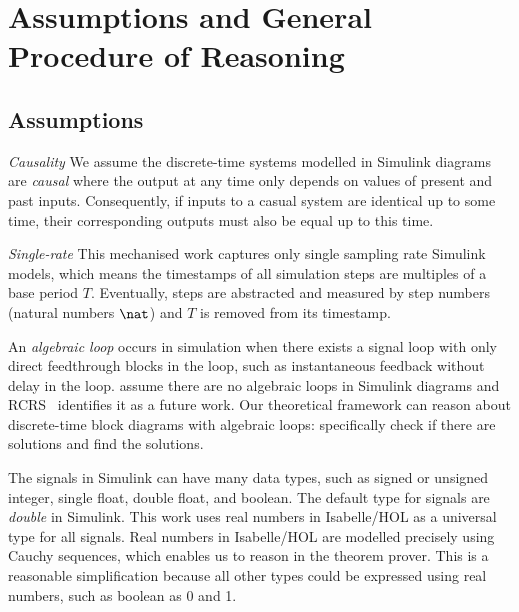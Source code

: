 \section{Assumptions and General Procedure of Reasoning}
\label{sec:assum}
\subsection{Assumptions}
\emph{Causality} We assume the discrete-time systems modelled in Simulink diagrams are \emph{causal} where the output at any time only depends on values of present and past inputs. Consequently, if inputs to a casual system are identical up to some time, their corresponding outputs must also be equal up to this time.

\emph{Single-rate} This mechanised work captures only single sampling rate Simulink models, which means the timestamps of all simulation steps are multiples of a base period $T$. Eventually, steps are abstracted and measured by step numbers (natural numbers $\nat$) and $T$ is removed from its timestamp. 

An \emph{algebraic loop} occurs in simulation when there exists a signal loop with only direct feedthrough blocks in the loop, such as instantaneous feedback without delay in the loop. \cite{Bostroem2016, Caspi2003, Dragomir2016} assume there are no algebraic loops in Simulink diagrams and RCRS~\cite{Preoteasa2017} identifies it as a future work. Our theoretical framework can reason about discrete-time block diagrams with algebraic loops: specifically check if there are solutions and find the solutions.

The signals in Simulink can have many data types, such as signed or unsigned integer, single float, double float, and boolean. %
The default type for signals are \emph{double} in Simulink. This work uses real numbers in Isabelle/HOL as a universal type for all signals. Real numbers in Isabelle/HOL are modelled precisely using Cauchy sequences, which enables us to reason in the theorem prover. This is a reasonable simplification because all other types could be expressed using real numbers, such as boolean as 0 and 1. 

%
%
%
%

